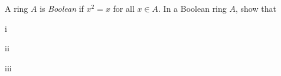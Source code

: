 \begin{exercise}
A ring \(A\) is \emph{Boolean} if \(x^2 = x\) for all \(x \in A\).
In a Boolean ring \(A\), show that
\end{exercise}

\begin{partsolution}{1}{11}{i}

\end{partsolution}

\begin{partsolution}{1}{11}{ii}

\end{partsolution}

\begin{partsolution}{1}{11}{iii}

\end{partsolution}